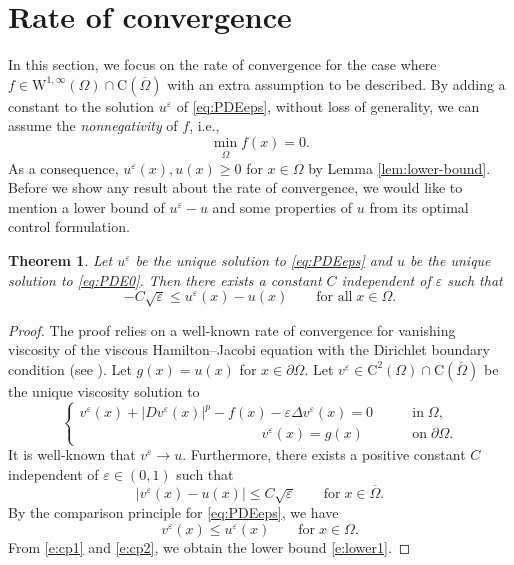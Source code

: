 \documentclass[12pt,reqno]{amsart}
\numberwithin{figure}{section}
\theoremstyle{plain}
\newtheorem{thm}{Theorem}[section]
\theoremstyle{remark}
\numberwithin{equation}{section}
\begin{document}
\section{Rate of convergence}
In this section, we focus on the rate of convergence for the case where $f\in \mathrm{W}^{1,\infty}(\Omega)\cap\mathrm{C}(\overline{\Omega})$ with an extra assumption to be described. By adding a constant to the solution $u^\varepsilon$ of \eqref{eq:PDEeps}, without loss of generality, we can assume the \emph{nonnegativity} of $f$, i.e.,
\begin{equation}\label{e:minf}
    \min_{\overline{\Omega}} f(x) = 0.
\end{equation}
As a consequence, $u^\varepsilon(x),u(x)\geq 0$ for $x\in \Omega$ by Lemma \ref{lem:lower-bound}. Before we show any result about the rate of convergence, we would like to mention a lower bound of $u^\varepsilon - u$ and some properties of $u$ from its optimal control formulation.
\begin{thm} Let $u^\varepsilon$ be the unique solution to \eqref{eq:PDEeps} and $u$ be the unique solution to \eqref{eq:PDE0}. Then there exists a constant $C$ independent of $\varepsilon$ such that
\begin{equation}\label{e:lower1}
    -C\sqrt{\varepsilon} \leq u^\varepsilon(x) - u(x) \qquad\text{for all}\;x\in \Omega.
\end{equation} 
\end{thm}
\begin{proof} The proof relies on a well-known rate of convergence for vanishing viscosity of the viscous Hamilton--Jacobi equation with the Dirichlet boundary condition (see \cite{crandall1984,evans_adjoint_2010,fleming_convergence_1961,Tran2011}). Let $g(x) = u(x)$ for $x\in \partial\Omega$. Let $v^\varepsilon\in \mathrm{C}^2(\Omega)\cap \mathrm{C}(\overline{\Omega})$ be the unique viscosity solution to
\begin{equation*}
    \begin{cases}
          v^\varepsilon(x) + |Dv^\varepsilon(x)|^p - f(x) - \varepsilon \Delta v^\varepsilon(x) = 0 &\qquad\text{in}\;\Omega,\\
        \qquad\qquad\qquad\qquad\qquad \qquad\quad v^\varepsilon(x) = g(x) &\qquad\text{on}\;\partial\Omega.
    \end{cases}
\end{equation*}
It is well-known that $v^\varepsilon \to u$. Furthermore, there exists a positive constant $C$ independent of $\varepsilon\in (0,1)$ such that 
\begin{equation}\label{e:cp1}
     |v^\varepsilon(x)  - u(x)| \leq C\sqrt{\varepsilon} \qquad\text{for}\;x\in \overline{\Omega}.
\end{equation}
By the comparison principle for \eqref{eq:PDEeps}, we have
\begin{equation}\label{e:cp2}
    v^\varepsilon(x)\leq u^\varepsilon(x) \qquad\text{for}\;x\in \Omega.
\end{equation}
From \eqref{e:cp1} and \eqref{e:cp2}, we obtain the lower bound \eqref{e:lower1}.
\end{proof}
\end{document}
